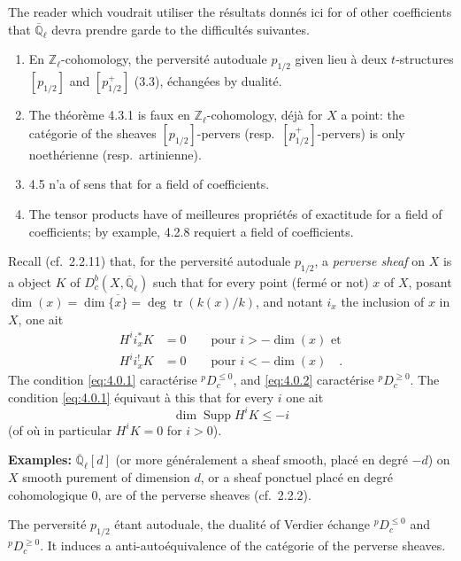 \documentclass[12pt,a4paper]{article}
\theoremstyle{plain}
\theoremstyle{definition}
\DeclareMathOperator{\Supp}{Supp}
\DeclareMathOperator{\tr}{tr}
\begin{document}
The reader which voudrait utiliser the r\'{e}sultats donn\'{e}s ici for of other coefficients that $\overline{\mathbb{Q}}_{\ell}$ devra prendre garde to the difficult\'{e}s suivantes.
\begin{enumerate}
\item[(a)] En $\mathbb{Z}_{\ell}$-cohomology, the perversit\'{e} autoduale $p_{1/2}$ given lieu \`{a} deux $t$-structures $[p_{1/2}]$ and $[p_{1/2}^{+}]$ (3.3), \'{e}chang\'{e}es by dualit\'{e}.
\item[(b)] The th\'{e}or\`{e}me 4.3.1 is faux en $\mathbb{Z}_{\ell}$-cohomology, d\'{e}j\`{a} for $X$ a point: the cat\'{e}gorie of the sheaves $[p_{1/2}]$-pervers (resp.\ $[p_{1/2}^{+}]$-pervers) is only noeth\'{e}rienne (resp.\ artinienne).
\item[(c)] 4.5 n'a of sens that for a field of coefficients.
\item[(d)] The tensor products have of meilleures propri\'{e}t\'{e}s of exactitude for a field of coefficients; by example, 4.2.8 requiert a field of coefficients.
\end{enumerate}

Recall (cf.\ 2.2.11) that, for the perversit\'{e} autoduale $p_{1/2}$, a \emph{perverse sheaf} on $X$ is a object $K$ of $D_{c}^{b}(X,\overline{\mathbb{Q}}_{\ell})$ such that for every point (ferm\'{e} or not) $x$ of $X$, posant $\dim(x) = \dim\overline{\{x\}} = \deg \tr(k(x)/k)$, and notant $i_{x}$ the inclusion of $x$ in $X$, one ait
\begin{align}
H^{i}i_{x}^{*}K &= 0 \qquad \text{pour } i > -\dim(x) \text{ et} \label{eq:4.0.1} \\
H^{i}i_{x}^{!}K &= 0 \qquad \text{pour } i < -\dim(x)\quad. \label{eq:4.0.2}
\end{align}
The condition \eqref{eq:4.0.1} caract\'{e}rise ${}^{p}D_{c}^{\leq 0}$, and \eqref{eq:4.0.2} caract\'{e}rise ${}^{p}D_{c}^{\geq 0}$. The condition \eqref{eq:4.0.1} \'{e}quivaut \`{a} this that for every $i$ one ait
\begin{equation}\label{eq:4.0.1prime}
\dim \Supp H^{i}K \leq -i
\end{equation}
(of o\`{u} in particular $H^{i}K = 0$ for $i > 0$).

\noindent\textbf{Examples:} $\overline{\mathbb{Q}}_{\ell}[d]$ (or more g\'{e}n\'{e}ralement a sheaf smooth, plac\'{e} en degr\'{e} $-d$) on $X$ smooth purement of dimension $d$, or a sheaf ponctuel plac\'{e} en degr\'{e} cohomologique $0$, are of the perverse sheaves (cf.\ 2.2.2).

The perversit\'{e} $p_{1/2}$ \'{e}tant autoduale, the dualit\'{e} of Verdier \'{e}change ${}^{p}D_{c}^{\leq 0}$ and ${}^{p}D_{c}^{\geq 0}$. It induces a anti-auto\'{e}quivalence of the cat\'{e}gorie of the perverse sheaves.
\end{document}
